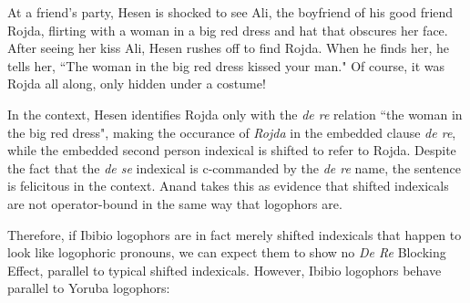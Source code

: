 \documentclass[output=paper]{langscibook}
\begin{document}
\begin{context}
At a friend's party, Hesen is shocked to see Ali, the boyfriend of his good friend Rojda, flirting with a woman in a big red dress and hat that obscures her face. After seeing her kiss Ali, Hesen rushes off to find Rojda. When he finds her, he tells her, ``The woman in the big red dress kissed your man." Of course, it was Rojda all along, only hidden under a costume!
\end{context}
\begin{exe}
	\label{noblock}
\end{exe}
In the context, Hesen identifies Rojda only with the \textit{de re} relation ``the woman in the big red dress", making the occurance of \textit{Rojda} in the embedded clause \textit{de re}, while the embedded second person indexical is shifted to refer to Rojda. Despite the fact that the \textit{de se} indexical is c-commanded by the \textit{de re} name, the sentence is felicitous in the context. Anand takes this as evidence that shifted indexicals are not operator-bound in the same way that logophors are.

Therefore, if Ibibio logophors are in fact merely shifted indexicals that happen to look like logophoric pronouns, we can expect them to show no \textit{De Re} Blocking Effect, parallel to typical shifted indexicals. However, Ibibio logophors behave parallel to Yoruba logophors:
\begin{exe}
\end{exe}
\end{document}

